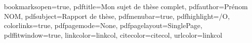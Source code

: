 \hypersetup
{
bookmarksopen=true,
pdftitle={Mon sujet de thèse complet},
pdfauthor={Prénom NOM},
pdfsubject={Rapport de thèse},
pdfmenubar=true,
pdfhighlight=/O,
colorlinks=true,
pdfpagemode=None,
pdfpagelayout=SinglePage,
pdffitwindow=true,
linkcolor=linkcol,
citecolor=citecol,
urlcolor=linkcol
}



\usepackage{fancyhdr}
\pagestyle{fancy}
\fancyfoot{}
\fancyhead[LE,RO]{\bfseries\thepage}
\fancyhead[RE]{\bfseries\nouppercase{\leftmark}}
\fancyhead[LO]{\bfseries\nouppercase{\rightmark}}

\let\headruleORIG\headrule
\renewcommand{\headrule}{\color{black} \headruleORIG}
\renewcommand{\headrulewidth}{1.0pt}
\usepackage{colortbl}

\fancypagestyle{plain}{
  \fancyhead{}
  \fancyfoot[C]{\thepage}
  \renewcommand{\headrulewidth}{0pt}
}

\usepackage[footnote]{acronym}


\usepackage[style=alphabetic-verb,backend=bibtex,isbn=false,doi=false,backref=true,url=false]{biblatex}


\makeatletter
\def\cleardoublepage{\clearpage\if@twoside \ifodd\c@page\else%
  \hbox{}%
  \thispagestyle{empty}%
  \newpage%
  \if@twocolumn\hbox{}\newpage\fi\fi\fi}
\makeatother

\newenvironment{vcenterpage}
{\newpage\vspace*{\fill}\thispagestyle{empty}\renewcommand{\headrulewidth}{0pt}}
{\vspace*{\fill}}



